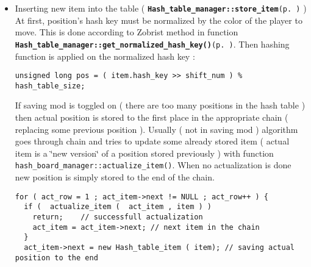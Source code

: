 \begin{itemize}
\item Inserting new item into the table ( {\tt {\bf Hash\_\-table\_\-manager::store\_\-item}{\rm (p.\,\pageref{classHash__table__manager_a5})}} ) At first, position's hash key must be normalized by the color of the player to move. This is done according to Zobrist method in function {\tt {\bf Hash\_\-table\_\-manager::get\_\-normalized\_\-hash\_\-key()}{\rm (p.\,\pageref{classHash__table__manager_a4})}}. Then hashing function is applied on the normalized hash key : 

\footnotesize\begin{verbatim}unsigned long pos = ( item.hash_key >> shift_num ) % hash_table_size;
\end{verbatim}
\normalsize
 If saving mod is toggled on ( there are too many positions in the hash table ) then actual position is stored to the first place in the appropriate chain ( replacing some previous position ). Usually ( not in saving mod ) algorithm goes through chain and tries to update some already stored item ( actual item is a \char`\"{}new version\char`\"{} of a position stored previously ) with function {\tt hash\_\-board\_\-manager::actualize\_\-item()}. When no actualization is done new position is simply stored to the end of the chain. 

\footnotesize\begin{verbatim}for ( act_row = 1 ; act_item->next != NULL ; act_row++ ) {
  if (  actualize_item (  act_item , item ) ) 
    return;    // successfull actualization
    act_item = act_item->next; // next item in the chain
  }
  act_item->next = new Hash_table_item ( item); // saving actual position to the end
\end{verbatim}
\normalsize
\end{itemize}


